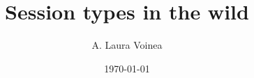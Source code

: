 \documentclass{mproj}
\begin{document}
\title{Session types in the wild}


\author{A. Laura Voinea}
\date{\today}

\maketitle

\tableofcontents
\clearpage

\renewcommand*\thesection{\arabic{section}}



 
\clearpage

\appendix
\end{document}
